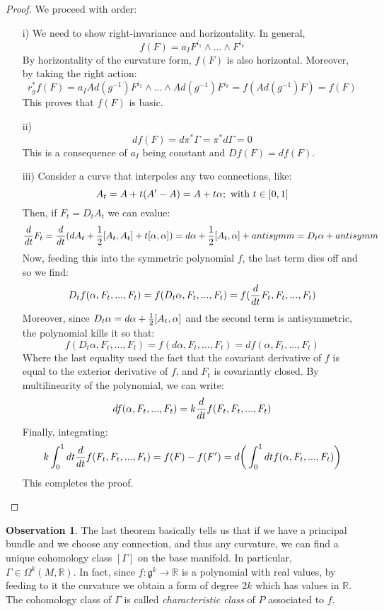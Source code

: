 \documentclass[12pt,a4paper]{report}
\theoremstyle{definition}
\theoremstyle{Theorem}
\theoremstyle{definition}
\theoremstyle{definition}
\newtheorem{Obs}[Def]{Observation}
\begin{document}
		\begin{proof}
			We proceed with order:
			\begin{itemize}
				\item[i)] We need to show right-invariance and horizontality. In general, $$f(F)=a_IF^{i_1}\wedge ...\wedge F^{i_k}$$
				By horizontality of the curvature form, $f(F)$ is also horizontal. Moreover, by taking the right action:
				$$r_g^*f(F)=a_IAd(g^{-1})F^{i_1}\wedge ...\wedge Ad(g^{-1})F^{i_k}=f(Ad(g^{-1})F)=f(F)$$
				This proves that $f(F)$ is basic.
				\item[ii)]
				$$df(F)=d\pi^*\Gamma=\pi^*d\Gamma=0$$
				This is a consequence of $a_I$ being constant and $Df(F)=df(F)$.
				\item [iii)]
				Consider a curve that interpoles any two connections, like:
				$$A_t=A+t(A'-A)=A+t\alpha; \hbox{ with }t\in[0,1] $$
				Then, if $F_t=D_tA_t$ we can evalue:
				$${d\over dt} F_t={d\over dt}(dA_t+{1\over 2}[A_t,A_t]+t[\alpha,\alpha])=d\alpha+{1\over 2}[A_t,\alpha]+antisymm=D_t\alpha+antisymm$$
				Now, feeding this into the symmetric polynomial $f$, the last term dies off and so we find:
				$$D_tf(\alpha,F_t,...,F_t)=f(D_t\alpha,F_t,...,F_t)=f({d\over dt}F_t,F_t,...,F_t)$$
				Moreover, since $D_t\alpha=d\alpha+{1\over 2}[A_t,\alpha]$ and the second term is antisymmetric, the polynomial kills it so that:
				$$f(D_t\alpha,F_t,...,F_t)=f(d\alpha,F_t,...,F_t)=df(\alpha,F_t,...,F_t)$$
				Where the last equality used the fact that the covariant derivative of $f$ is equal to the exterior derivative of $f$, and $F_t$ is covariantly closed.
				By multilinearity of the polynomial, we can write:
				$$df(\alpha,F_t,...,F_t)=k{d\over dt}f(F_t,F_t,...,F_t)$$
				Finally, integrating:
				$$k\int_0^1 dt {d\over dt}f(F_t,F_t,...,F_t)=f(F)-f(F')=d\bigg(\int_0^1 dt f(\alpha,F_t,...,F_t)\bigg)$$
				This completes the proof.
			\end{itemize}
		\end{proof}
		\begin{Obs}
			The last theorem basically tells us that if we have a principal bundle and we choose any connection, and thus any curvature, we can find a unique cohomology class $[\Gamma]$ on the base manifold. In particular, $\Gamma\in\Omega^k(M,\mathbb{R})$. In fact, since $f:\mathfrak{g}^k\rightarrow \mathbb{R}$ is a polynomial with real values, by feeding to it the curvature we obtain a form of degree $2k$ which has values in $\mathbb{R}$. The cohomology class of $\Gamma$ is called \textit{characteristic class} of $P$ associated to $f$.
		\end{Obs}
\end{document}
